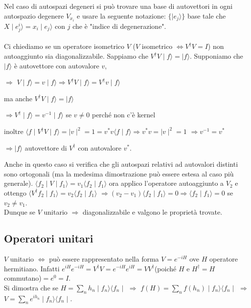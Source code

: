 Nel caso di autospazi degeneri si può trovare una base di autovettori in ogni autospazio degenere $V_{x_{i}}$ e usare la seguente notazione: $\lbrace \mid e_{j}\rangle \rbrace$ base tale che $X \mid e_{j}^{i}\rangle = x_{i} \mid e_{j}\rangle$ con $j$ che è "indice di degenerazione".\\ \\
Ci chiediamo se un operatore isometrico $V$ ($V$ isometrico $\Leftrightarrow V^{\dag}V=I$) non autoaggiunto sia diagonalizzabile. Sappiamo che $V^{\dag}V \mid f \rangle=\mid f\rangle $. Supponiamo che  $\mid f\rangle$ è autovettore con autovalore $v$, \begin{center} $\Rightarrow$ $V\mid f\rangle = v\mid f\rangle \Rightarrow V^{\dag}V \mid f\rangle = V^{\dag}v \mid f\rangle$ \end{center}
\begin{center} ma anche $V^{\dag}V \mid f\rangle= \mid f\rangle$ \end{center}
\begin{center} $\Rightarrow V^{\dag}\mid f\rangle=v^{-1}\mid f\rangle$ se $v\neq 0$ perché non c'è kernel \end{center}
\begin{center} inoltre $\langle f \mid V^{\dag}V \mid f\rangle = \mid v \mid ^{2} = 1=v^{*}v \langle f \mid f\rangle \Rightarrow v^{*}v=\mid v \mid ^{2} =1$ $\Rightarrow v^{-1}=v^{*}$ \end{center}
\begin{center} $\Rightarrow \mid f\rangle$ autovettore di $V^{\dag}$ con autovalore $v^{*}$. \end{center}
Anche in questo caso si verifica che gli autospazi relativi ad autovalori distinti sono ortogonali (ma la medesima dimostrazione può essere estesa al caso più generale). $\langle f_{2} \mid V \mid f_{1} \rangle = v_{1} \langle f_{2} \mid f_{1} \rangle$ ora applico l'operatore autoaggiunto a $V_{2}$ e ottengo $\langle V^{\dag}f_{2} \mid f_{1} \rangle = v_{2}\langle f_{2} \mid f_{1} \rangle$ $\Rightarrow (v_{2} -v_{1})\langle f_{2} \mid f_{1} \rangle=0 \Rightarrow \langle f_{2} \mid f_{1} \rangle=0$ se $v_{2}\neq v_{1}$. \\
 Dunque se $V$ unitario $\Rightarrow$ diagonalizzabile e valgono le proprietà trovate.


\subsection{Operatori unitari} %
$V$ unitario $\Leftrightarrow$ può essere rappresentato nella forma $V=e^{-iH}$ ove $H$ operatore hermitiano. Infatti $e^{iH}e^{-iH}= V^{\dag}V=e^{-iH}e^{iH}=VV^{\dag}$(poiché $H$ e $H^{\dag}=H$ commutano)$=e^{0}=I$.\\
Si dimostra che se $H= \sum_{n} h_{n} \mid f_{n} \rangle \langle f_{n} \mid$  $\Rightarrow$ $f(H)= \sum_{n} f(h_{n}) \mid f_{n} \rangle \langle f_{n} \mid$ $\Rightarrow$ $V=\sum_{n} e^{ih_{n}} \mid f_{n} \rangle \langle f_{n} \mid$.

%
